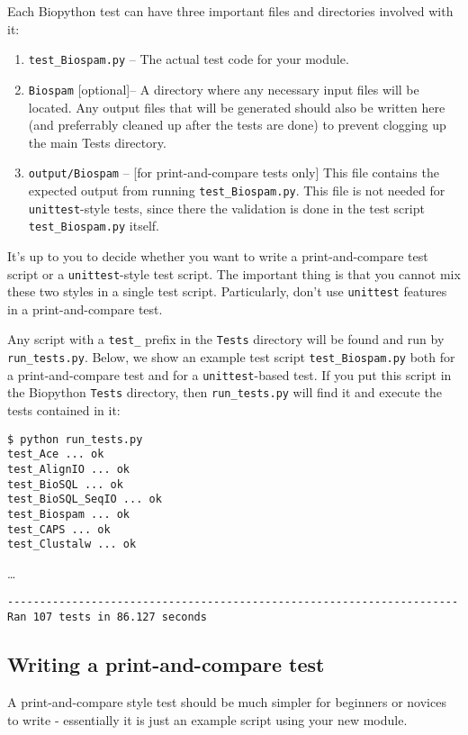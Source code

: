 \documentclass{report}
\begin{document}
Each Biopython test can have three important files and directories involved with it:

\begin{enumerate}
  \item \verb|test_Biospam.py| -- The actual test code for your module.
  \item \verb|Biospam| [optional]-- A directory where any necessary input files
    will be located. Any output files that will be generated should also
    be written here (and preferrably cleaned up after the tests are
    done) to prevent clogging up the main Tests directory.
  \item \verb|output/Biospam| -- [for print-and-compare tests only] This
    file contains the expected output from running \verb|test_Biospam.py|.
    This file is not needed for \verb|unittest|-style tests, since there
    the validation is done in the test script \verb|test_Biospam.py| itself.
\end{enumerate}

It's up to you to decide whether you want to write a print-and-compare test script or a \verb|unittest|-style test script. The important thing is that you cannot mix these two styles in a single test script. Particularly, don't use \verb|unittest| features in a print-and-compare test.

Any script with a \verb|test_| prefix in the \verb|Tests| directory will be found and run by \verb|run_tests.py|. Below, we show an example test script \verb|test_Biospam.py| both for a print-and-compare test and for a \verb|unittest|-based test. If you put this script in the Biopython \verb|Tests| directory, then \verb|run_tests.py| will find it and execute the tests contained in it:
\begin{verbatim}
$ python run_tests.py     
test_Ace ... ok
test_AlignIO ... ok
test_BioSQL ... ok
test_BioSQL_SeqIO ... ok
test_Biospam ... ok
test_CAPS ... ok
test_Clustalw ... ok
\end{verbatim}
\ldots
\begin{verbatim}
----------------------------------------------------------------------
Ran 107 tests in 86.127 seconds
\end{verbatim}

\subsection{Writing a print-and-compare test}

A print-and-compare style test should be much simpler for beginners
or novices to write - essentially it is just an example script using
your new module.
\end{document}
